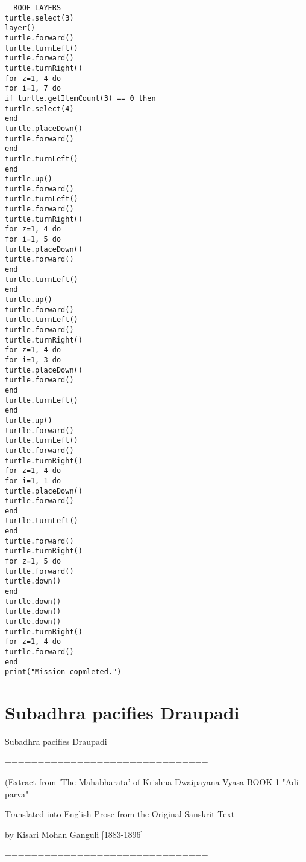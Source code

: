 \documentclass[a1paper]{article}
\begin{document}
\begin{multicols}{7}
{\begin{verbatim}
--ROOF LAYERS
turtle.select(3)
layer()
turtle.forward()
turtle.turnLeft()
turtle.forward()
turtle.turnRight()
for z=1, 4 do
for i=1, 7 do
if turtle.getItemCount(3) == 0 then
turtle.select(4)
end
turtle.placeDown()
turtle.forward()
end
turtle.turnLeft()
end
turtle.up()
turtle.forward()
turtle.turnLeft()
turtle.forward()
turtle.turnRight()
for z=1, 4 do
for i=1, 5 do
turtle.placeDown()
turtle.forward()
end
turtle.turnLeft()
end
turtle.up()
turtle.forward()
turtle.turnLeft()
turtle.forward()
turtle.turnRight()
for z=1, 4 do
for i=1, 3 do
turtle.placeDown()
turtle.forward()
end
turtle.turnLeft()
end
turtle.up()
turtle.forward()
turtle.turnLeft()
turtle.forward()
turtle.turnRight()
for z=1, 4 do
for i=1, 1 do
turtle.placeDown()
turtle.forward()
end
turtle.turnLeft()
end
turtle.forward()
turtle.turnRight()
for z=1, 5 do
turtle.forward()
turtle.down()
end
turtle.down()
turtle.down()
turtle.down()
turtle.turnRight()
for z=1, 4 do
turtle.forward()
end
print("Mission copmleted.")
\end{verbatim}



\section{Subadhra pacifies Draupadi}
Subadhra pacifies Draupadi

===============================

\setlength{\parskip}{0cm} 
(Extract from 'The Mahabharata' of Krishna-Dwaipayana Vyasa BOOK 1 "Adi-parva"
\setlength{\parskip}{0.8em}
 
Translated into English Prose from the Original Sanskrit Text
 
by Kisari Mohan Ganguli [1883-1896]
\setlength{\parskip}{0.0em}

===============================

\setlength{\parskip}{0.8em}

}
\end{multicols}
\end{document}
